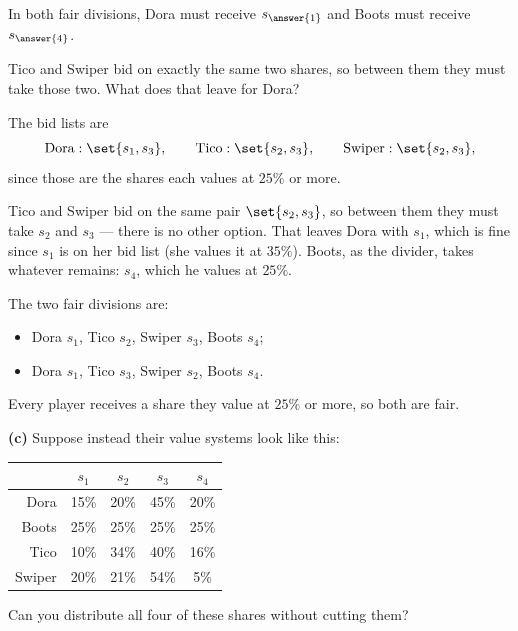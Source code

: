 \documentclass[12pt]{ximera}
\begin{document}
\begin{problem}
\begin{prompt}
\smallskip
In both fair divisions, Dora must receive $s_{\answer{1}}$ and Boots must receive
$s_{\answer{4}}$.

\begin{hint}
Tico and Swiper bid on exactly the same two shares, so between them they must take
those two. What does that leave for Dora?
\end{hint}

\begin{solution}
The bid lists are
\[
\text{Dora}: \set{s_1, s_3}, \qquad
\text{Tico}: \set{s_2, s_3}, \qquad
\text{Swiper}: \set{s_2, s_3},
\]
since those are the shares each values at $25\%$ or more.

Tico and Swiper bid on the same pair $\set{s_2, s_3}$, so between them they must take
$s_2$ and $s_3$ --- there is no other option. That leaves Dora with $s_1$, which is
fine since $s_1$ is on her bid list (she values it at $35\%$). Boots, as the divider,
takes whatever remains: $s_4$, which he values at $25\%$.

The two fair divisions are:
\begin{itemize}
\item Dora $s_1$, Tico $s_2$, Swiper $s_3$, Boots $s_4$;
\item Dora $s_1$, Tico $s_3$, Swiper $s_2$, Boots $s_4$.
\end{itemize}
Every player receives a share they value at $25\%$ or more, so both are fair.
\end{solution}
\end{prompt}

\begin{prompt}
\textbf{(c)} Suppose instead their value systems look like this:

\begin{center}
\begin{tabular}{r|c|c|c|c|}
& $s_1$ & $s_2$ & $s_3$ & $s_4$ \\\hline
Dora   & 15\% & 20\% & 45\% & 20\% \\\hline
Boots  & 25\% & 25\% & 25\% & 25\% \\\hline
Tico   & 10\% & 34\% & 40\% & 16\% \\\hline
Swiper & 20\% & 21\% & 54\% &  5\% \\\hline
\end{tabular}
\end{center}

Can you distribute all four of these shares without cutting them?

\begin{multipleChoice}
\end{multipleChoice}


\end{prompt}
\end{problem}
\end{document}
